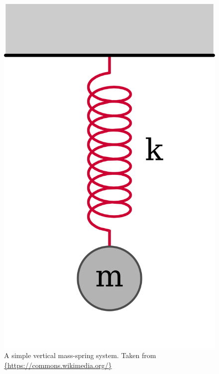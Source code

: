 \begin{figure}[t]
	\centering
	\includegraphics[height=0.25\textheight]{include/vertical_mass_spring}
	\caption[A simple vertical mass-spring system]{A simple vertical mass-spring system. Taken from \url{{https://commons.wikimedia.org/}}}
	\label{img:vertical_mass_spring}
\end{figure}

